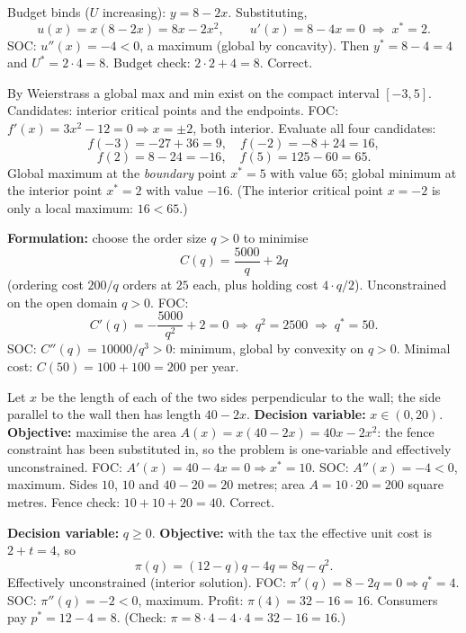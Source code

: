 \begin{solutions}
  \item Budget binds ($U$ increasing): $y=8-2x$. Substituting,
        \[
          u(x)=x(8-2x)=8x-2x^{2}, \qquad
          u'(x)=8-4x=0 \;\Rightarrow\; x^{*}=2 .
        \]
        SOC: $u''(x)=-4<0$, a maximum (global by concavity). Then
        $y^{*}=8-4=4$ and $U^{*}=2\cdot 4=8$. Budget check:
        $2\cdot 2+4=8$. Correct.

  \item By Weierstrass a global max and min exist on the compact
        interval $[-3,5]$. Candidates: interior critical points and the
        endpoints. FOC: $f'(x)=3x^{2}-12=0 \Rightarrow x=\pm 2$, both
        interior. Evaluate all four candidates:
        \[
          f(-3)=-27+36=9, \quad f(-2)=-8+24=16,
        \]
        \[
          f(2)=8-24=-16, \quad f(5)=125-60=65 .
        \]
        Global maximum at the \emph{boundary} point $x^{*}=5$ with
        value $65$; global minimum at the interior point $x^{*}=2$ with
        value $-16$. (The interior critical point $x=-2$ is only a
        local maximum: $16<65$.)

  \item \textbf{Formulation:} choose the order size $q>0$ to minimise
        \[
          C(q)=\frac{5000}{q}+2q
        \]
        (ordering cost $200/q$ orders at $25$ each, plus holding cost
        $4\cdot q/2$). Unconstrained on the open domain $q>0$. FOC:
        \[
          C'(q)=-\frac{5000}{q^{2}}+2=0
          \;\Rightarrow\; q^{2}=2500 \;\Rightarrow\; q^{*}=50 .
        \]
        SOC: $C''(q)=10000/q^{3}>0$: minimum, global by convexity on
        $q>0$. Minimal cost: $C(50)=100+100=200$ per year.

  \item Let $x$ be the length of each of the two sides perpendicular
        to the wall; the side parallel to the wall then has length
        $40-2x$. \textbf{Decision variable:} $x\in(0,20)$.
        \textbf{Objective:} maximise the area
        $A(x)=x(40-2x)=40x-2x^{2}$: the fence constraint has been
        substituted in, so the problem is one-variable and effectively
        unconstrained. FOC: $A'(x)=40-4x=0 \Rightarrow x^{*}=10$. SOC:
        $A''(x)=-4<0$, maximum. Sides $10$, $10$ and
        $40-20=20$ metres; area $A=10\cdot 20=200$ square metres.
        Fence check: $10+10+20=40$. Correct.

  \item \textbf{Decision variable:} $q\ge 0$. \textbf{Objective:}
        with the tax the effective unit cost is $2+t=4$, so
        \[
          \pi(q)=(12-q)q-4q=8q-q^{2} .
        \]
        Effectively unconstrained (interior solution). FOC:
        $\pi'(q)=8-2q=0 \Rightarrow q^{*}=4$. SOC: $\pi''(q)=-2<0$,
        maximum. Profit: $\pi(4)=32-16=16$. Consumers pay
        $p^{*}=12-4=8$. (Check: $\pi=8\cdot 4-4\cdot 4=32-16=16$.)
\end{solutions}

